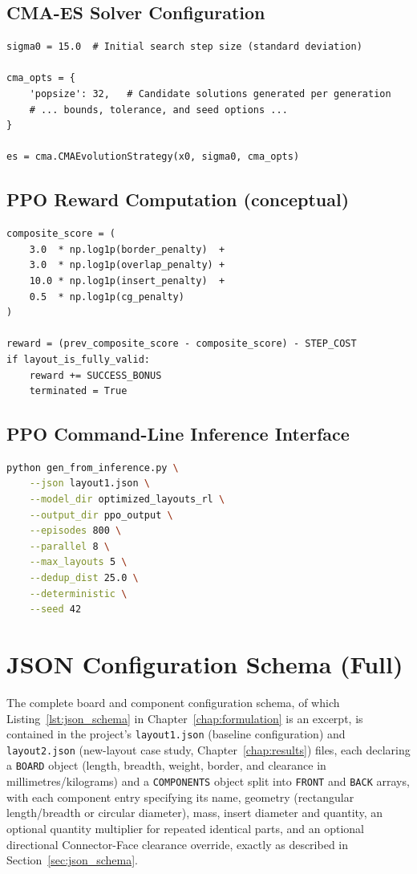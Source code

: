 \documentclass[11pt,a4paper,oneside]{report}
\begin{document}
\section{CMA-ES Solver Configuration}
\begin{lstlisting}[caption={CMA-ES strategy initialisation (\texttt{CMA-ES/cma-es-local.py})}]
sigma0 = 15.0  # Initial search step size (standard deviation)

cma_opts = {
    'popsize': 32,   # Candidate solutions generated per generation
    # ... bounds, tolerance, and seed options ...
}

es = cma.CMAEvolutionStrategy(x0, sigma0, cma_opts)
\end{lstlisting}

\section{PPO Reward Computation (conceptual)}
\begin{lstlisting}[caption={Composite, log-compressed PPO reward formulation (\texttt{PPO} training notebook)}]
composite_score = (
    3.0  * np.log1p(border_penalty)  +
    3.0  * np.log1p(overlap_penalty) +
    10.0 * np.log1p(insert_penalty)  +
    0.5  * np.log1p(cg_penalty)
)

reward = (prev_composite_score - composite_score) - STEP_COST
if layout_is_fully_valid:
    reward += SUCCESS_BONUS
    terminated = True
\end{lstlisting}

\section{PPO Command-Line Inference Interface}
\begin{lstlisting}[language=bash, caption={Standalone multi-layout generation CLI (\texttt{PPO/gen\_from\_inference.py})}]
python gen_from_inference.py \
    --json layout1.json \
    --model_dir optimized_layouts_rl \
    --output_dir ppo_output \
    --episodes 800 \
    --parallel 8 \
    --max_layouts 5 \
    --dedup_dist 25.0 \
    --deterministic \
    --seed 42
\end{lstlisting}

\chapter{JSON Configuration Schema (Full)}
The complete board and component configuration schema, of which Listing~\ref{lst:json_schema} in Chapter~\ref{chap:formulation} is an excerpt, is contained in the project's \texttt{layout1.json} (baseline configuration) and \texttt{layout2.json} (new-layout case study, Chapter~\ref{chap:results}) files, each declaring a \texttt{BOARD} object (length, breadth, weight, border, and clearance in millimetres/kilograms) and a \texttt{COMPONENTS} object split into \texttt{FRONT} and \texttt{BACK} arrays, with each component entry specifying its name, geometry (rectangular length/breadth or circular diameter), mass, insert diameter and quantity, an optional quantity multiplier for repeated identical parts, and an optional directional Connector-Face clearance override, exactly as described in Section~\ref{sec:json_schema}.
\end{document}
